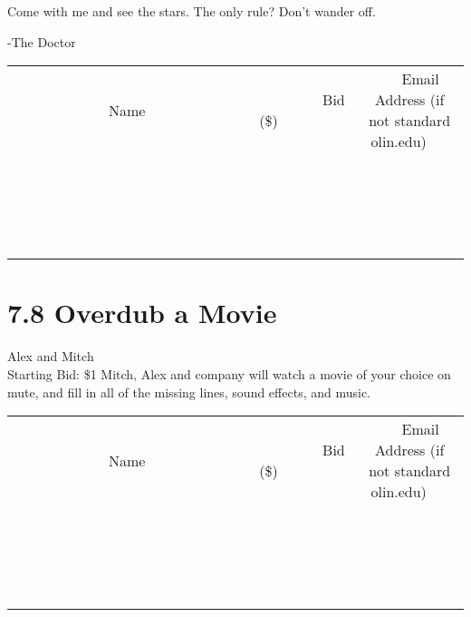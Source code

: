 \documentclass[11pt]{article}
\begin{document}
Come with me and see the stars. The only rule? Don't wander off.

-The Doctor
\\[3ex]
\begin{tabular}{c c c}
~~~~~~~~~~~~~Name~~~~~~~~~~~~~ & ~~~~~~~~~Bid (\$)~~~~~~~~~  & ~~~Email Address (if not standard olin.edu)~~~\\
 & & \\
\hline
 & & \\
\hline
 & & \\
\hline
 & & \\
\hline
 & & \\
\hline
 & & \\
\hline
 & & \\
\hline
 & & \\
\hline
 & & \\
\hline
 & & \\
\hline
 & & \\
\hline
 & & \\
\hline
 & & \\
\hline
 & & \\
\hline
 & & \\
\hline
 & & \\
\hline
 & & \\
\hline
 & & \\
\hline
 & & \\
\hline
\end{tabular}
\newpage
\section*{7.8 Overdub a Movie}
Alex and Mitch
\\
Starting Bid: \$1
\newline
Mitch, Alex and company will watch a movie of your choice on mute, and fill in all of the missing lines, sound effects, and music.
\\[3ex]
\begin{tabular}{c c c}
~~~~~~~~~~~~~Name~~~~~~~~~~~~~ & ~~~~~~~~~Bid (\$)~~~~~~~~~  & ~~~Email Address (if not standard olin.edu)~~~\\
 & & \\
\hline
 & & \\
\hline
 & & \\
\hline
 & & \\
\hline
 & & \\
\hline
 & & \\
\hline
 & & \\
\hline
 & & \\
\hline
 & & \\
\hline
 & & \\
\hline
 & & \\
\hline
 & & \\
\hline
 & & \\
\hline
 & & \\
\hline
 & & \\
\hline
 & & \\
\hline
 & & \\
\hline
 & & \\
\hline
 & & \\
\hline
\end{tabular}
\newpage
\end{document}
